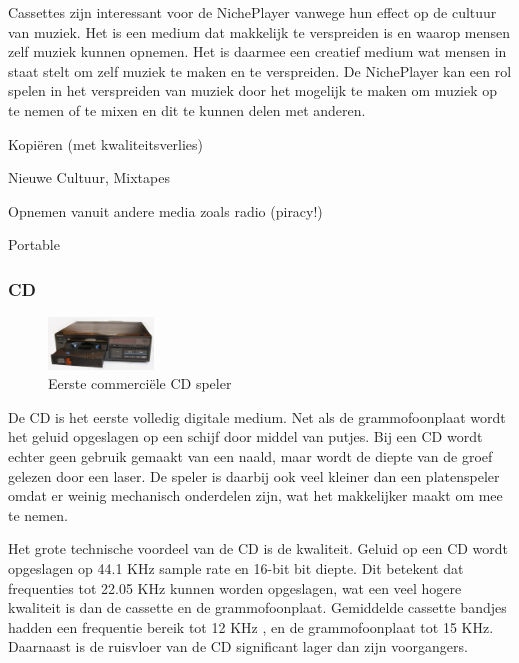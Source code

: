 Cassettes zijn interessant voor de NichePlayer vanwege hun effect op de cultuur van muziek. Het is een medium dat makkelijk te verspreiden is en waarop mensen zelf muziek kunnen opnemen. Het is daarmee een creatief medium wat mensen in staat stelt om zelf muziek te maken en te verspreiden. De NichePlayer kan een rol spelen in het verspreiden van muziek door het mogelijk te maken om muziek op te nemen of te mixen en dit te kunnen delen met anderen.

\begin{todolist}
    \item Kopiëren (met kwaliteitsverlies)
    \item[\done] Nieuwe Cultuur, Mixtapes
    \item[\done] Opnemen vanuit andere media zoals radio (piracy!)
    \item[\done] Portable
\end{todolist}

\subsubsection*{CD}
\begin{figure}
    \centering
    \includegraphics[width=0.25\textwidth]{assets/critical-review/CD-Player.jpeg}
    \caption{Eerste commerciële CD speler}
    \label{fig:critical-review:cp-player}
\end{figure}
De CD is het eerste volledig digitale medium. Net als de grammofoonplaat wordt het geluid opgeslagen op een schijf door middel van putjes. Bij een CD wordt echter geen gebruik gemaakt van een naald, maar wordt de diepte van de groef gelezen door een laser. De speler is daarbij ook veel kleiner dan een platenspeler omdat er weinig mechanisch onderdelen zijn, wat het makkelijker maakt om mee te nemen.

Het grote technische voordeel van de CD is de kwaliteit. Geluid op een CD wordt opgeslagen op 44.1 KHz sample rate en 16-bit bit diepte. Dit betekent dat frequenties tot 22.05 KHz kunnen worden opgeslagen, wat een veel hogere kwaliteit is dan de cassette en de grammofoonplaat. Gemiddelde cassette bandjes hadden een frequentie bereik tot 12 KHz \citep{van1970audio}, en de grammofoonplaat tot 15 KHz. Daarnaast is de ruisvloer van de CD significant lager dan zijn voorgangers.

